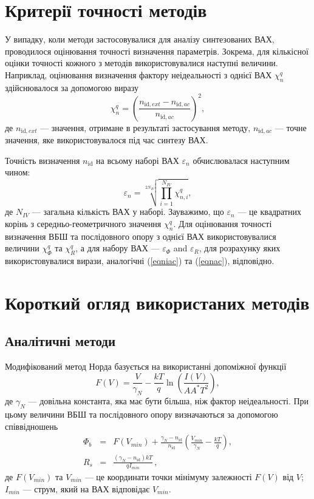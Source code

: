 \documentclass[a4paper,14pt,oneside,openany]{memoir}
\begin{document}
\section{Критерії точності методів}
У випадку, коли методи застосовувалися для аналізу синтезованих ВАХ, проводилося оцінювання точності визначення параметрів.
Зокрема, для кількісної оцінки точності кожного з методів використовувалися наступні величини.
Наприклад, оцінювання визначення фактору неідеальності з однієї ВАХ $\chi^q_n$ здійснювалося за допомогою виразу
\begin{equation}
\label{eqniac}
\chi^q_n=\left(\frac{n_{\mathrm{id},ext}-n_{\mathrm{id},ac}}{n_{\mathrm{id},ac}}\right)^2,
\end{equation}
де
$n_{\mathrm{id},ext}$ --- значення, отримане в результаті застосування методу,
$n_{\mathrm{id},ac}$ --- точне значення, яке використовувалося під час синтезу ВАХ.


Точність визначення $n_\mathrm{id}$ на всьому наборі ВАХ $\varepsilon_n$ обчислювалася  наступним чином:
\begin{equation}
\label{eqnac}
\varepsilon_n=\sqrt[2N_{I\!V}]{\prod_{i=1}^{N_{I\!V}}\chi^q_{n,i}},
\end{equation}
де
$N_{I\!V}$ --- загальна кількість ВАХ у наборі.
Зауважимо, що $\varepsilon_n$ --- це квадратних корінь з середньо-геометричного значення $\chi^q_n$.
Для оцінювання точності визначення ВБШ та послідовного опору з однієї ВАХ використовувалися величини  $\chi^q_\Phi$ та $\chi^q_R$, а для набору ВАХ --- $\varepsilon_\Phi$ and $\varepsilon_R$, для розрахунку яких використовувалися вирази, аналогічні (\ref{eqniac}) та (\ref{eqnac}), відповідно.

\section{Короткий огляд використаних методів}
\subsection{Аналітичні методи}
Модифікований метод Норда \cite{Norde,Lien,Sato,Dermircioglu:Norde} базується на використанні допоміжної функції
\begin{equation}
\label{eqNorde}
F(V)=\frac{V}{\gamma_N}-\frac{kT}{q}\ln\left(\frac{I(V)}{AA^*T^2}\right),
\end{equation}
де
$\gamma_N$ --- довільна константа, яка має бути більша, ніж фактор неідеальності.
При цьому величини ВБШ та послідовного опору визначаються за допомогою співвідношень
\begin{eqnarray}
\label{eqNordDet}
\Phi_b&=&F(V_{min})+\frac{\gamma_N-n_\mathrm{id}}{n_\mathrm{id}}\left(\frac{V_{min}}{\gamma_N}-\frac{kT}{q}\right),
\\
R_s&=&\frac{(\gamma_N-n_\mathrm{id})kT}{qI_{min}}\,,
\end{eqnarray}
де
$F(V_{min})$ та $V_{min}$ --- це координати точки мінімуму залежності $F(V)$ від $V$;
$I_{min}$  --- струм, який на ВАХ відповідає $V_{min}$.
\end{document}
